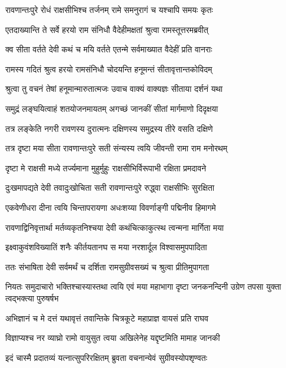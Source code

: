 \twolineshloka
{रावणान्तःपुरे रोधं राक्षसीभिश्च तर्जनम्}
{रामे समनुरागं च यश्चापि समयः कृतः} %

\twolineshloka
{एतदाख्यान्ति ते सर्वे हरयो राम संनिधौ}
{वैदेहीमक्षतां श्रुत्वा रामस्तूत्तरमब्रवीत्} %

\twolineshloka
{क्व सीता वर्तते देवी कथं च मयि वर्तते}
{एतन्मे सर्वमाख्यात वैदेहीं प्रति वानराः} %

\twolineshloka
{रामस्य गदितं श्रुत्व हरयो रामसंनिधौ}
{चोदयन्ति हनूमन्तं सीतावृत्तान्तकोविदम्} %

\twolineshloka
{श्रुत्वा तु वचनं तेषां हनूमान्मारुतात्मजः}
{उवाच वाक्यं वाक्यज्ञः सीताया दर्शनं यथा} %

\twolineshloka
{समुद्रं लङ्घयित्वाहं शतयोजनमायतम्}
{अगच्छं जानकीं सीतां मार्गमाणो दिदृक्षया} %

\twolineshloka
{तत्र लङ्केति नगरी रावणस्य दुरात्मनः}
{दक्षिणस्य समुद्रस्य तीरे वसति दक्षिणे} %

\twolineshloka
{तत्र दृष्टा मया सीता रावणान्तःपुरे सती}
{संन्यस्य त्वयि जीवन्ती रामा राम मनोरथम्} %

\twolineshloka
{दृष्टा मे राक्षसी मध्ये तर्ज्यमाना मुहुर्मुहुः}
{राक्षसीभिर्विरूपाभी रक्षिता प्रमदावने} %

\twolineshloka
{दुःखमापद्यते देवी तवादुःखोचिता सती}
{रावणान्तःपुरे रुद्ध्वा राक्षसीभिः सुरक्षिता} %

\twolineshloka
{एकवेणीधरा दीना त्वयि चिन्तापरायणा}
{अधःशय्या विवर्णाङ्गी पद्मिनीव हिमागमे} %

\twolineshloka
{रावणाद्विनिवृत्तार्था मर्तव्यकृतनिश्चया}
{देवी कथंचित्काकुत्स्थ त्वन्मना मार्गिता मया} %

\twolineshloka
{इक्ष्वाकुवंशविख्यातिं शनैः कीर्तयतानघ}
{स मया नरशार्दूल विश्वासमुपपादिता} %

\twolineshloka
{ततः संभाषिता देवी सर्वमर्थं च दर्शिता}
{रामसुग्रीवसख्यं च श्रुत्वा प्रीतिमुपागता} %

\threelineshloka
{नियतः समुदाचारो भक्तिश्चास्यास्तथा त्वयि}
{एवं मया महाभागा दृष्टा जनकनन्दिनी}
{उग्रेण तपसा युक्ता त्वद्भक्त्या पुरुषर्षभ} %

\twolineshloka
{अभिज्ञानं च मे दत्तं यथावृत्तं तवान्तिके}
{चित्रकूटे महाप्राज्ञ वायसं प्रति राघव} %

\twolineshloka
{विज्ञाप्यश्च नर व्याघ्रो रामो वायुसुत त्वया}
{अखिलेनेह यद्दृष्टमिति मामाह जानकी} %

\twolineshloka
{इदं चास्मै प्रदातव्यं यत्नात्सुपरिरक्षितम्}
{ब्रुवता वचनान्येवं सुग्रीवस्योपशृण्वतः} %

